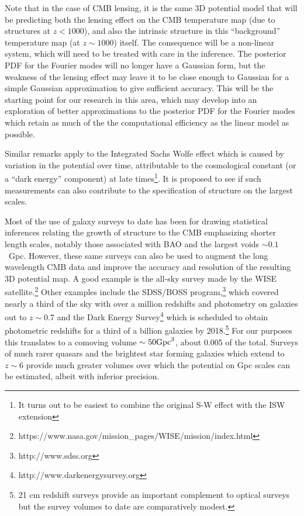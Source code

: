 \documentclass[psfig,12pt]{article}
\def\ni{\noindent}
\begin{document}
{Note that in the case of CMB lensing, it is the same 3D potential model
that will be predicting both the lensing effect on the CMB temperature
map (due to structures at $z < 1000$), and  also the intrinsic structure
in this ``background'' temperature map (at $z \sim 1000$) itself. The
consequence will be a non-linear system, which will need to be treated
with care in the inference. The posterior PDF for the Fourier modes will
no longer have a Gaussian form, but the weakness of the lensing effect
may leave it to be close enough to Gaussian for a simple Gaussian
approximation to give sufficient accuracy. This will be the starting
point for our research in this area, which may develop into an
exploration  of better approximations to the posterior PDF for the
Fourier modes  which retain as much of the the computational efficiency
as the linear model as possible.

Similar remarks apply to the Integrated Sachs Wolfe effect which is
caused by variation in the potential over time, attributable to the
cosmological constant (or a ``dark energy'' component) at late times\footnote{It turns out to be easiest to combine the original S-W effect with the ISW extension}.
It is proposed to see if such
measurements can also contribute to the specification of structure on
the largest scales.

\ni{\bf Galaxy Surveys and the ``Local'' Universe:}
Most of the use of galaxy surveys to date has been for drawing statistical inferences
relating the growth of structure to the CMB emphasizing shorter length
scales, notably those associated with BAO and the largest voids
$\sim0.1$~Gpc. However, these same surveys can also be used to augment
the long wavelength CMB data and improve the accuracy and resolution of
the resulting 3D potential map. A good example is the
all-sky survey made by the WISE satellite.\footnote{https://www.nasa.gov/mission\_pages/WISE/mission/index.html}
Other examples include the SDSS/BOSS
program,\footnote{http://www.sdss.org} which covered nearly a third of
the sky with over a million redshifts and photometry on galaxies out to
$z\sim0.7$ and the Dark Energy Survey\footnote{http://www.darkenergysurvey.org} which is scheduled to obtain photometric redshifts for a third of a billion galaxies by 2018.\footnote{21 cm redshift surveys provide an important
complement to optical surveys but the survey volumes to date are
comparatively modest.} For our purposes this translates to a comoving
volume $\sim50{\rm Gpc}^3$, about 0.005 of the total. Surveys of much
rarer quasars and the brightest star forming galaxies which extend to
$z\sim6$ provide much greater volumes over which the potential on Gpc
scales can be estimated, albeit with inferior precision.

}
\end{document}
